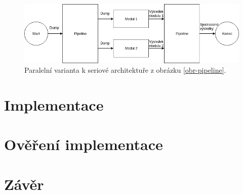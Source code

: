 \begin{figure}[ht!]
	\centering
	\includegraphics[scale=0.55]{obrazky/parallel_pipeline.png}
	\caption{Paralelní varianta k seriové architektuře z obrázku \ref{obr-pipeline}.}
	\label{obr-pipeline-parallel}
\end{figure}

\chapter{Implementace}
\chapter{Ověření implementace}
\chapter{Závěr}